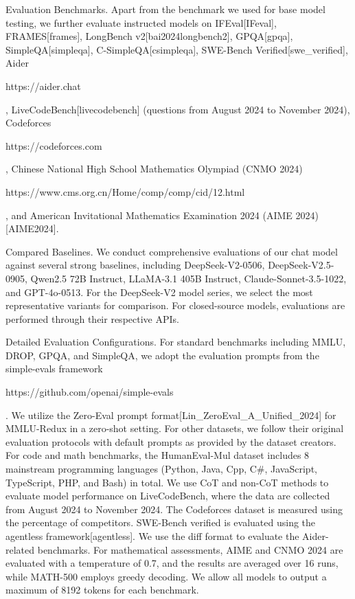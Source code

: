 \documentclass[11pt,a4paper]{article}
\begin{document}
Evaluation Benchmarks.
Apart from the benchmark we used for base model testing, we further evaluate instructed models on IFEval[IFeval], FRAMES[frames], LongBench v2[bai2024longbench2], GPQA[gpqa], SimpleQA[simpleqa], C-SimpleQA[csimpleqa], SWE-Bench Verified[swe\_verified], Aider

https://aider.chat

, LiveCodeBench[livecodebench] (questions from August 2024 to November 2024), Codeforces

https://codeforces.com

, Chinese National High School Mathematics Olympiad (CNMO 2024)

https://www.cms.org.cn/Home/comp/comp/cid/12.html

, and American Invitational Mathematics Examination 2024 (AIME 2024)[AIME2024].

Compared Baselines.
We conduct comprehensive evaluations of our chat model against several strong baselines, including DeepSeek-V2-0506, DeepSeek-V2.5-0905, Qwen2.5 72B Instruct, LLaMA-3.1 405B Instruct, Claude-Sonnet-3.5-1022, and GPT-4o-0513. 
For the DeepSeek-V2 model series, we select the most representative variants for comparison. 
For closed-source models, evaluations are performed through their respective APIs.

Detailed Evaluation Configurations.
For standard benchmarks including MMLU, DROP, GPQA, and SimpleQA, we adopt the evaluation prompts from the simple-evals framework

https://github.com/openai/simple-evals

. 
We utilize the Zero-Eval prompt format[Lin\_ZeroEval\_A\_Unified\_2024] for MMLU-Redux in a zero-shot setting. 
For other datasets, we follow their original evaluation protocols with default prompts as provided by the dataset creators.
For code and math benchmarks, the HumanEval-Mul dataset includes 8 mainstream programming languages (Python, Java, Cpp, C\#, JavaScript, TypeScript, PHP, and Bash) in total. 
We use CoT and non-CoT methods to evaluate model performance on LiveCodeBench, where the data are collected from August 2024 to November 2024. 
The Codeforces dataset is measured using the percentage of competitors. 
SWE-Bench verified is evaluated using the agentless framework[agentless]. 
We use the diff format to evaluate the Aider-related benchmarks. 
For mathematical assessments, AIME and CNMO 2024 are evaluated with a temperature of 0.7, and the results are averaged over 16 runs, while MATH-500 employs greedy decoding. 
We allow all models to output a maximum of 8192 tokens for each benchmark.
\end{document}

